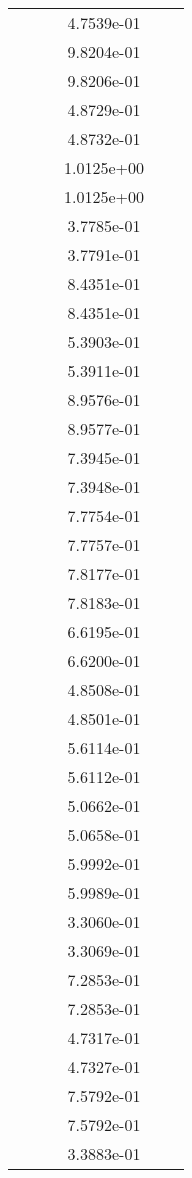 \begin{xltabular}{\textwidth}{r|rS[table-format=1.3e+2]S[table-format=1.4e+2]S[table-format=1.4e+2]S[table-format=-1.5]}
&  &  & 4.7539e-01 & & \\
&  &  & 9.8204e-01 & & \\
&  &  & 9.8206e-01 & & \\
&  &  & 4.8729e-01 & & \\
&  &  & 4.8732e-01 & & \\
&  &  & 1.0125e+00 & & \\
&  &  & 1.0125e+00 & & \\
&  &  & 3.7785e-01 & & \\
&  &  & 3.7791e-01 & & \\
&  &  & 8.4351e-01 & & \\
&  &  & 8.4351e-01 & & \\
&  &  & 5.3903e-01 & & \\
&  &  & 5.3911e-01 & & \\
&  &  & 8.9576e-01 & & \\
&  &  & 8.9577e-01 & & \\
&  &  & 7.3945e-01 & & \\
&  &  & 7.3948e-01 & & \\
&  &  & 7.7754e-01 & & \\
&  &  & 7.7757e-01 & & \\
&  &  & 7.8177e-01 & & \\
&  &  & 7.8183e-01 & & \\
&  &  & 6.6195e-01 & & \\
&  &  & 6.6200e-01 & & \\
&  &  & 4.8508e-01 & & \\
&  &  & 4.8501e-01 & & \\
&  &  & 5.6114e-01 & & \\
&  &  & 5.6112e-01 & & \\
&  &  & 5.0662e-01 & & \\
&  &  & 5.0658e-01 & & \\
&  &  & 5.9992e-01 & & \\
&  &  & 5.9989e-01 & & \\
&  &  & 3.3060e-01 & & \\
&  &  & 3.3069e-01 & & \\
&  &  & 7.2853e-01 & & \\
&  &  & 7.2853e-01 & & \\
&  &  & 4.7317e-01 & & \\
&  &  & 4.7327e-01 & & \\
&  &  & 7.5792e-01 & & \\
&  &  & 7.5792e-01 & & \\
&  &  & 3.3883e-01 & & \\

\end{xltabular}
